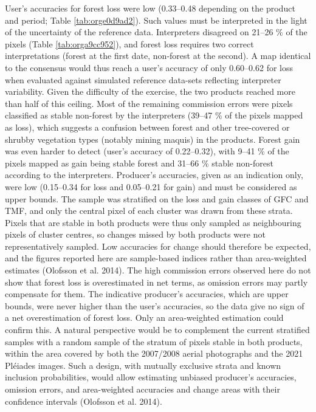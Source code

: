 \documentclass[paper=a4, fontsize=12pt, DIV=13, english, dvipsnames]{scrartcl}
\makeatletter
\newcommand{\cslcitation}[2]
 {\protect\hyper@linkstart{cite}{citeproc_bib_item_#1}#2\hyper@linkend}
\makeatother
\begin{document}
User's accuracies for forest loss were low (0.33--0.48 depending on the product and period; Table \ref{tab:orge0d9ad2}). Such values must be interpreted in the light of the uncertainty of the reference data. Interpreters disagreed on 21--26 \% of the pixels (Table \ref{tab:orga9cc952}), and forest loss requires two correct interpretations (forest at the first date, non-forest at the second). A map identical to the consensus would thus reach a user's accuracy of only 0.60--0.62 for loss when evaluated against simulated reference data-sets reflecting interpreter variability. Given the difficulty of the exercise, the two products reached more than half of this ceiling. Most of the remaining commission errors were pixels classified as stable non-forest by the interpreters (39--47 \% of the pixels mapped as loss), which suggests a confusion between forest and other tree-covered or shrubby vegetation types (notably mining maquis) in the products. Forest gain was even harder to detect (user's accuracy of 0.22--0.32), with 9--41 \% of the pixels mapped as gain being stable forest and 31--66 \% stable non-forest according to the interpreters. Producer's accuracies, given as an indication only, were low (0.15--0.34 for loss and 0.05--0.21 for gain) and must be considered as upper bounds. The sample was stratified on the loss and gain classes of GFC and TMF, and only the central pixel of each cluster was drawn from these strata. Pixels that are stable in both products were thus only sampled as neighbouring pixels of cluster centres, so changes missed by both products were not representatively sampled. Low accuracies for change should therefore be expected, and the figures reported here are sample-based indices rather than area-weighted estimates (\cslcitation{9}{Olofsson et al. 2014}). The high commission errors observed here do not show that forest loss is overestimated in net terms, as omission errors may partly compensate for them. The indicative producer's accuracies, which are upper bounds, were never higher than the user's accuracies, so the data give no sign of a net overestimation of forest loss. Only an area-weighted estimation could confirm this. A natural perspective would be to complement the current stratified samples with a random sample of the stratum of pixels stable in both products, within the area covered by both the 2007/2008 aerial photographs and the 2021 Pléiades images. Such a design, with mutually exclusive strata and known inclusion probabilities, would allow estimating unbiased producer's accuracies, omission errors, and area-weighted accuracies and change areas with their confidence intervals (\cslcitation{9}{Olofsson et al. 2014}).
\end{document}
